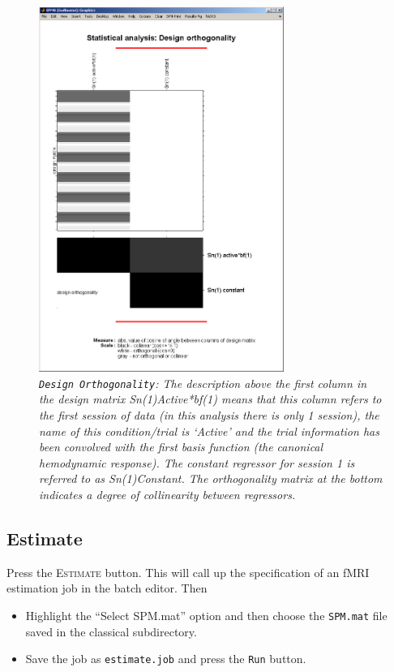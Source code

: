 \begin{figure}
\begin{center}
\includegraphics[width=80mm]{auditory/aud_orth}
\caption{\emph{\texttt{Design Orthogonality}: The description above the first column in the design matrix {\sf Sn(1)Active*bf(1)} means that this column refers to the first session of data (in this analysis there is only 1 session), the name of this condition/trial is `Active' and the trial information has been convolved with the first basis function (the canonical hemodynamic response). The constant regressor for session 1 is referred to as {\sf Sn(1)Constant}. The orthogonality matrix at the bottom indicates a degree of collinearity between regressors. \label{aud_orth}}}
\end{center}
\end{figure}

\subsection{Estimate}

Press the \textsc{Estimate} button. This will call up the specification of an fMRI estimation job in the batch editor. Then

\begin{itemize}
\item Highlight the ``Select SPM.mat'' option and then choose the \texttt{SPM.mat} file saved in the classical subdirectory.
\item Save the job as \texttt{estimate.job} and press the \texttt{Run} button.
\end{itemize}

